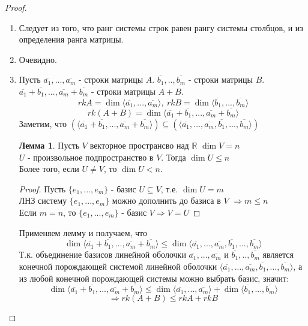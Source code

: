 \documentclass[a4paper, 12pt]{article}
\newcommand{\R}{\mathbb R}
\newcommand\tab[1][.5cm]{\hspace*{#1}}
\theoremstyle{definition}
\newtheorem*{lemma}{Лемма}
\begin{document}
  \begin{proof} \tab
    \begin{enumerate} 
      \item Следует из того, что ранг системы строк равен рангу системы столбцов, и из определения ранга матрицы.
      \item Очевидно. 
      \item Пусть $\overline{a_1},...,\overline{a_m}$ - строки матрицы $A$. $\overline{b_1},..,\overline{b_m}$  - строки матрицы $B$. \\
      $\overline{a_1} + \overline{b_1} ,..., \overline{a_m} + \overline{b_m}$ - строки матрицы $A+B$. 
      $$rkA = \dim \langle \overline{a_1},...,\overline{a_m} \rangle, \ rkB = \dim \langle \overline{b_1},...,\overline{b_m} \rangle$$   
      $$rk(A+B) = \dim \langle \overline{a_1} + \overline{b_1} ,..., \overline{a_m} + \overline{b_m} \rangle$$ 
      Заметим, что $(\langle \overline{a_1} + \overline{b_1} ,..., \overline{a_m} + \overline{b_m} \rangle) \subseteq (\langle \overline{a_1},...,\overline{a_m}, \overline{b_1},...,\overline{b_m} \rangle)$   
      \begin{lemma}
        Пусть $V$ векторное пространсво над $\R$ $\dim V = n$  \\
        $U$ -  произвольное подпространство в $V$. Тогда $\dim U \leq n$ \\
        Более того, если $U \neq V$, то $\dim U<n$.
      \end{lemma} 
      \begin{proof} 
        Пусть $\{e_1,...,e_m\}$ - базис $U \subseteq V$, т.е. $\dim U = m$ \\
        ЛНЗ систему $\{e_1,...,e_m\}$ можно дополнить до базиса в $V$ $\Longrightarrow m\leq n$  \\
        Если $m = n$, то $\{e_1,...,e_m\}$ - базис $V \Longrightarrow V=U$
      \end{proof} 
      Применяем лемму и получаем, что 
      $$\dim\langle \overline{a_1} + \overline{b_1} ,..., \overline{a_m} + \overline{b_m} \rangle \leq \dim\langle \overline{a_1},...,\overline{a_m}, \overline{b_1},...,\overline{b_m} \rangle$$ 
      Т.к. объединение базисов линейной оболочки $\overline{a_1},...,\overline{a_m}$ и $\overline{b_1},..,\overline{b_m}$ является конечной порождающей системой линейной оболочки $\langle \overline{a_1},...,\overline{a_m}, \overline{b_1},...,\overline{b_m} \rangle$, а из любой конечной порождающей системы можно выбрать базис, значит: $$\dim\langle \overline{a_1} + \overline{b_1} ,..., \overline{a_m} + \overline{b_m} \rangle \leq \dim\langle \overline{a_1},...,\overline{a_m} \rangle + \dim\langle \overline{b_1},...,\overline{b_m} \rangle$$ $$\Longrightarrow  rk(A+B) \leq rkA + rkB$$

\end{enumerate}
\end{proof}
\end{document}

